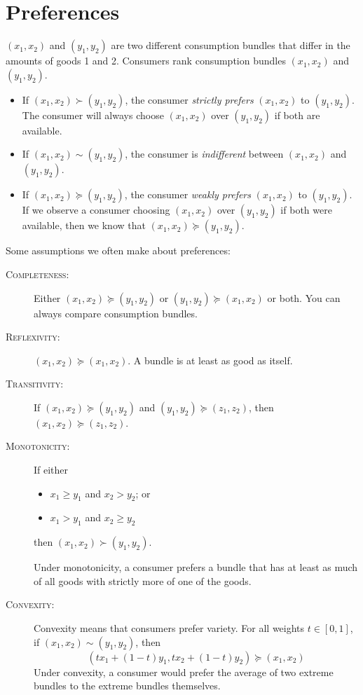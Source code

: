 \documentclass{article}
\begin{document}
\section{Preferences}
$\left( x_1,x_2 \right)$ and $\left( y_1,y_2 \right)$ are two different consumption bundles that differ in the amounts of goods 1 and 2. Consumers rank consumption bundles $\left( x_1,x_2 \right)$ and $\left( y_1,y_2 \right)$.
\begin{itemize}
  \item If $\left( x_1,x_2 \right)\succ \left( y_1,y_2 \right)$, the consumer \emph{strictly prefers} $\left( x_1,x_2 \right)$ to $\left( y_1,y_2 \right)$. The consumer will always choose $\left( x_1,x_2 \right)$ over $\left( y_1,y_2 \right)$ if both are available.
  \item If $\left( x_1,x_2 \right)\sim \left( y_1,y_2 \right)$, the consumer is \emph{indifferent} between $\left( x_1,x_2 \right)$ and $\left( y_1,y_2 \right)$.
  \item If $\left( x_1,x_2 \right)\succeq \left( y_1,y_2 \right)$, the consumer \emph{weakly prefers} $\left( x_1,x_2 \right)$ to $\left( y_1,y_2 \right)$. If we observe a consumer choosing $\left( x_1,x_2 \right)$ over $\left( y_1,y_2 \right)$ if both were available, then we know that $\left( x_1,x_2 \right)\succeq \left( y_1,y_2 \right)$.
\end{itemize}
Some assumptions we often make about preferences:
\begin{description}
  \item[\textsc{Completeness:}] Either $\left( x_1,x_2 \right)\succeq \left( y_1,y_2 \right)$ or $\left( y_1,y_2 \right)\succeq \left( x_1,x_2 \right)$ or both.  You can always compare consumption bundles.
  \item[\textsc{Reflexivity:}] $\left( x_1,x_2 \right)\succeq \left( x_1,x_2 \right)$. A bundle is at least as good as itself.
  \item[\textsc{Transitivity:}] If $\left( x_1,x_2 \right)\succeq \left( y_1,y_2\right)$ and $\left( y_1,y_2 \right)\succeq \left( z_1,z_2\right)$, then $\left( x_1,x_2 \right)\succeq \left( z_1,z_2\right)$.
  \item[\textsc{Monotonicity:}] If either \begin{itemize} \item $x_1 \geq y_1$ and $x_2 > y_2$; or \item  $x_1 > y_1$ and $x_2 \geq y_2$
    \end{itemize}
    then $\left( x_1,x_2 \right)\succ \left( y_1,y_2 \right)$.

    Under monotonicity, a consumer prefers a bundle that has at least as much of all goods with strictly more of one of the goods.
  \item[\textsc{Convexity:}] Convexity means that consumers prefer variety.
    For all weights $t\in\left[ 0,1 \right]$, if $\left( x_1,x_2 \right)\sim \left( y_1,y_2 \right)$, then
    \[
    \left(tx_1+ \left( 1-t \right)y_1, tx_2 + \left( 1-t
    \right)y_2\right)\succeq \left( x_1,x_2 \right)
    \]
    Under convexity, a consumer would prefer the average of two extreme bundles to the extreme bundles themselves.
\end{description}
\end{document}
